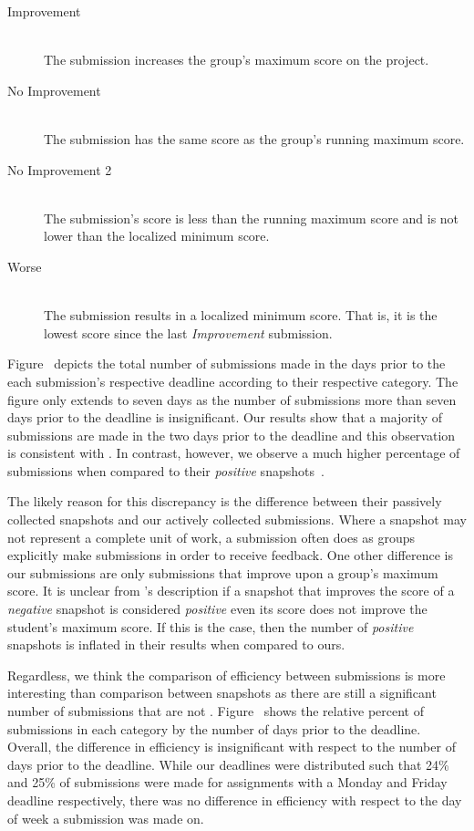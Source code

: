 \begin{description}
  \item[Improvement] \hfill \\ The submission increases the group's maximum
    score on the project.
  \item[No Improvement] \hfill \\ The submission has the same score as the
    group's running maximum score.
  \item[No Improvement 2] \hfill \\ The submission's score is less than the
    running maximum score and is not lower than the localized minimum score.
  \item[Worse] \hfill \\ The submission results in a localized minimum
    score. That is, it is the lowest score since the last \emph{Improvement}
    submission.
\end{description}

Figure~ depicts the total number of submissions
made in the days prior to the each submission's respective deadline according
to their respective category. The figure only extends to seven days as the
number of submissions more than seven days prior to the deadline is
insignificant. Our results show that a majority of submissions are made in the
two days prior to the deadline and this observation is consistent with
\spacco{}. In contrast, however, we observe a much higher percentage of \imp{}
submissions when compared to their \emph{positive}
snapshots~\cite{Spacco:2013:TIP:2462476.2465594}.

The likely reason for this discrepancy is the difference between their
passively collected snapshots and our actively collected submissions. Where a
snapshot may not represent a complete unit of work, a submission often does as
groups explicitly make submissions in order to receive feedback. One other
difference is our \imp{} submissions are only submissions that improve upon a
group's maximum score. It is unclear from \spacco{}'s description if a snapshot
that improves the score of a \emph{negative} snapshot is considered
\emph{positive} even its score does not improve the student's maximum score. If
this is the case, then the number of \emph{positive} snapshots is inflated in
their results when compared to ours.

Regardless, we think the comparison of efficiency between submissions is more
interesting than comparison between snapshots as there are still a significant
number of submissions that are not
\imp{}. Figure~ shows the relative percent of
submissions in each category by the number of days prior to the
deadline. Overall, the difference in efficiency is insignificant with respect
to the number of days prior to the deadline. While our deadlines were
distributed such that 24\% and 25\% of submissions were made for assignments
with a Monday and Friday deadline respectively, there was no difference in
efficiency with respect to the day of week a submission was made on.

